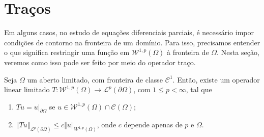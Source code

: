 \documentclass[a4paper, 11pt]{book}
\theoremstyle{definition}
\newcommand{\cC}{\mathcal{C}}
\newcommand{\cL}{\mathcal{L}}
\newcommand{\cW}{\mathcal{W}}
\begin{document}
\section{Traços}

Em alguns casos, no estudo de equações diferenciais parciais, é necessário impor condições de contorno na fronteira de um domínio. Para isso, precisamos entender o que significa restringir uma função em $\cW^{1,p}(\Omega)$ à fronteira de $\Omega$. Nesta seção, veremos como isso pode ser feito por meio do operador traço.

\begin{tbox} \label{thm:traco1}
    Seja $\Omega$ um aberto limitado, com fronteira de classe $\cC^1$. Então, existe um operador linear limitado $T : \cW^{1,p}(\Omega) \to \cL^p(\partial \Omega)$, com $1 \leqslant p < \infty$, tal que
    \begin{enumerate}[leftmargin=*, label=\textbf{(\alph*)}]
        \item $Tu = u \big|_{\partial \Omega}$ se $u \in \cW^{1,p}(\Omega) \cap \cC(\Omega)$;
        \item $\Vert Tu \Vert_{\cL^p(\partial\Omega)} \leqslant c \Vert u \Vert_{W^{1,p}(\Omega)}$, onde $c$ depende apenas de $p$ e $\Omega$.
    \end{enumerate}
\end{tbox} 
\end{document}
